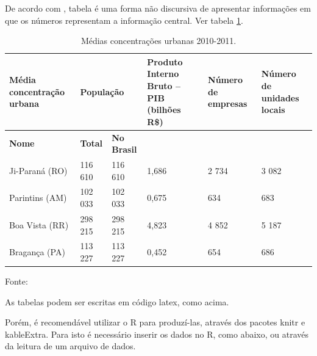 \documentclass[
	12pt,				%
	oneside,			%
	a4paper,			%
	chapter=TITLE,		%
	section=TITLE,		%
	english,			%
	brazil				%
	]{abntex2}
\newcommand{\pkg}[1]{{\normalfont\fontseries{b}\selectfont #1}}
\let\proglang=\textsf
\newcommand{\bcenter}{\begin{center}}
\newcommand{\ecenter}{\end{center}}
\begin{document}
De acordo com \textcite{ibge1993}, tabela é uma forma não discursiva de apresentar
informações em que os números representam a informação central.
Ver tabela \ref{tab:tab-1}.
\begin{table}[htb]
    \ABNTEXfontereduzida
    \caption{\label{tab:tab-1}Médias concentrações urbanas 2010-2011.}
    \begin{tabular}{@{}p{3.0cm}p{1.5cm}p{2cm}p{2.5cm}p{2.5cm}p{2.5cm}@{}}
        \toprule
        \textbf{Média concentração urbana} & \multicolumn{2}{l}{\textbf{População}} & \textbf{Produto Interno Bruto – PIB (bilhões R\$)} & \textbf{Número de empresas} & \textbf{Número de unidades locais} \\ \midrule
        \textbf{Nome}                      & \textbf{Total}   & \textbf{No Brasil}  &                                                   &                             & \\
        Ji-Paraná (RO)                     & 116 610          & 116 610             & 1,686                                             & 2 734                       & 3 082 \\
        Parintins (AM)                     & 102 033          & 102 033             & 0,675                                             & 634                         & 683 \\
        Boa Vista (RR)                     & 298 215          & 298 215             & 4,823                                             & 4 852                       & 5 187 \\
        Bragança (PA)                      & 113 227          & 113 227             & 0,452                                             & 654                         & 686 \\ \bottomrule
    \end{tabular}
\end{table}
\bcenter

Fonte: \textcite{ibge2016}
\ecenter

As tabelas podem ser escritas em código latex, como acima.

Porém, é recomendável utilizar o \proglang{R} para produzí-las, através dos pacotes
\pkg{knitr} e \pkg{kableExtra}. Para isto é necessário inserir os dados no
\proglang{R}, como abaixo, ou através da leitura de um arquivo de dados.
\end{document}
